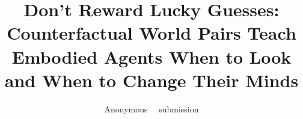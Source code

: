 \documentclass[10pt,twocolumn,letterpaper]{article}
\title{Don't Reward Lucky Guesses: Counterfactual World Pairs Teach Embodied Agents When to Look and When to Change Their Minds}
\author{Anonymous \confName~\confYear\ submission}
\begin{document}
\maketitle












{
    \small
    
    
}
\end{document}
